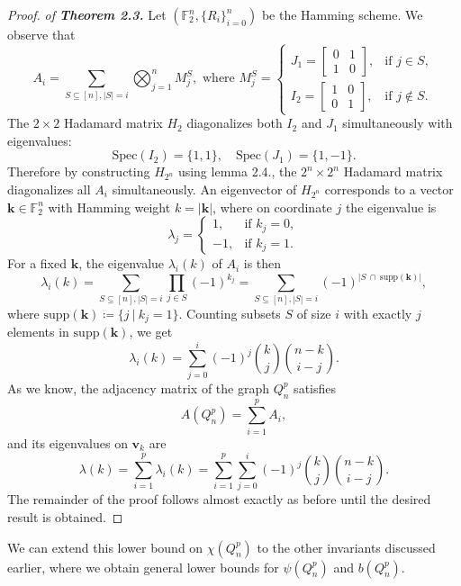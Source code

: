 \documentclass[12pt]{amsart}
\numberwithin{figure}{section}
\theoremstyle{plain}
\begin{document}
\begin{proof}
    \textit{of \textbf{Theorem 2.3.}} Let $(\mathbb{F}_{2}^{n}, \{R_{i}\}_{i=0}^{n})$ be the Hamming scheme. We observe that
    \[A_{i} = \sum_{S \subseteq [n],|S|=i} \bigotimes_{j=1}^n M_j^{S},  \text{ where } M_j^{S} = 
    \begin{cases}
        J_{1} = \begin{bmatrix}0 & 1 \\ 1 & 0 \end{bmatrix}, & \text{if } j \in S, \\
        I_{2} = \begin{bmatrix}1 & 0 \\ 0 & 1 \end{bmatrix}, & \text{if } j \notin S.
        \end{cases}\]
    The $2\times 2$ Hadamard matrix $H_{2}$ diagonalizes both $I_{2}$ and $J_{1}$ simultaneously with eigenvalues:
    \[\mathrm{Spec}(I_2) = \{1,1\}, \quad \mathrm{Spec}(J_1) = \{1,-1\}.\]
    Therefore by constructing $H_{2^{n}}$ using lemma 2.4., the $2^{n} \times 2^{n}$ Hadamard matrix diagonalizes all $A_{i}$ simultaneously. An eigenvector of $H_{2^{n}}$ corresponds to a vector $\mathbf{k} \in \mathbb{F}_{2}^{n}$ with Hamming weight $k = |\mathbf{k}|$, where on coordinate $j$ the eigenvalue is
    \[\lambda_j = 
    \begin{cases}
        1, & \text{if }k_{j} = 0, \\
        -1, & \text{if }k_{j} = 1.
    \end{cases}\]
    For a fixed $\mathbf{k}$, the eigenvalue $\lambda_i(k)$ of $A_{i}$ is then
    \[\lambda_i(k) = \sum_{S \subseteq [n], |S|=i} \prod_{j \in S} (-1)^{k_{j}} = \sum_{S \subseteq [n], |S|=i} (-1)^{|S \:\cap\: \mathrm{supp}(\mathbf{k})|},\]
    where $\mathrm{supp}(\mathbf{k}) \coloneq \{ j\:|\: k_{j} = 1 \}$. Counting subsets $S$ of size $i$ with exactly $j$ elements in $\mathrm{supp}(\mathbf{k})$, we get
    \[\lambda_i(k) = \sum_{j=0}^i (-1)^j \binom{k}{j} \binom{n-k}{i-j}.\]
    As we know, the adjacency matrix of the graph $Q_{n}^{p}$ satisfies
    \[A(Q_n^p) = \sum_{i=1}^p A_i,\]
    and its eigenvalues on $\mathbf{v}_{k}$ are
    \[\lambda(k) = \sum_{i=1}^{p} \lambda_{i}(k) = \sum_{i=1}^{p} \sum_{j=0}^{i} (-1)^{j} \binom{k}{j} \binom{n-k}{i-j}.\]
    \indent The remainder of the proof follows almost exactly as before until the desired result is obtained.
\end{proof}
\indent We can extend this lower bound on $\chi(Q_{n}^{p})$ to the other invariants discussed earlier, where we obtain general lower bounds for $\psi(Q_{n}^{p})$ and $b(Q_{n}^{p})$.
\end{document}
